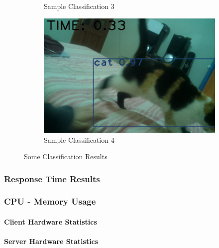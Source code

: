 \begin{figure}[h]
\begin{subfigure}[t]{0.49\linewidth}
    \caption{Sample Classification 3}
    \label{fig:classificationSample1}
    \end{subfigure}
    \begin{subfigure}[t]{0.49\linewidth}
    \includegraphics[width=\linewidth]{eserImg/sampleClassification4.jpg}
    \caption{Sample Classification 4}
    \label{fig:classificationSample1}
    
    \end{subfigure}
    
    \caption{Some Classification Results}
    \label{fig:classificationResults}
\end{figure}

\subsubsection{Response Time Results}

\subsubsection{CPU - Memory Usage}
\paragraph{Client Hardware Statistics}

\paragraph{Server Hardware Statistics}


